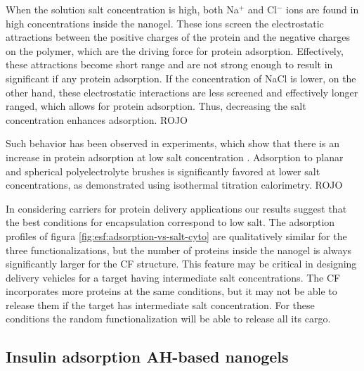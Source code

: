 When the solution salt concentration is high, both Na$^+$ and Cl$^-$ ions are found in high concentrations inside the nanogel.
These ions screen the electrostatic attractions between the positive charges of the protein and the negative charges on the polymer, which are the driving force for protein adsorption.
Effectively, these attractions become short range and are not strong enough to result in significant if any protein adsorption.
If the concentration of NaCl is lower, on the other hand, these electrostatic interactions are less screened and effectively longer ranged, which allows for protein adsorption.
Thus, decreasing the salt concentration enhances adsorption.
ROJO 
{Such behavior has been observed in experiments, which show that there is an increase in protein adsorption at low salt concentration .
Adsorption to planar and spherical polyelectrolyte brushes is significantly favored at lower salt concentrations, as demonstrated using isothermal titration calorimetry. ROJO




In considering carriers for protein delivery applications our results suggest that the best conditions for encapsulation correspond to low salt.
The adsorption profiles of figura \ref{fig:esf:adsorption-vs-salt-cyto} are qualitatively similar for the three functionalizations,
but the number of proteins inside the nanogel is always significantly larger for the CF structure.
This feature may be critical in designing delivery vehicles for a target having intermediate salt concentrations.
The CF incorporates more proteins at the same conditions, but it may not be able to release them if the target has intermediate salt concentration.
For these conditions the random functionalization will be able to release all its cargo.















\subsection{Insulin adsorption AH-based nanogels} 




}

